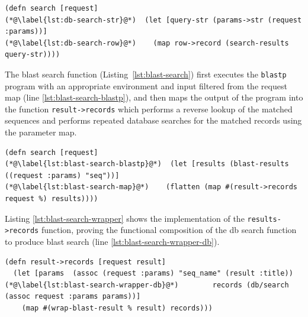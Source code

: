 \lstset{language=Clojure}
\begin{lstlisting}[label=lst:db-search,caption={%
      [The \texttt{db} namespace search function]
      The \texttt{db} namespace search function.}]
(defn search [request]
(*@\label{lst:db-search-str}@*)  (let [query-str (params->str (request :params))]
(*@\label{lst:db-search-row}@*)    (map row->record (search-results query-str))))
\end{lstlisting}


The blast search function (Listing~\ref{lst:blast-search}) first
executes the \texttt{blastp} program with an appropriate environment
and input filtered from the request map (line
\ref{lst:blast-search-blastp}), and then maps the output of the
program into the function \texttt{result->records} which performs a
reverse lookup of the matched sequences and performs repeated database
searches for the matched records using the parameter map.


\lstset{language=Clojure}
\begin{lstlisting}[label=lst:blast-search,caption={%
      [The \texttt{blast} namespace search function]
      The \texttt{blast} namespace search function.}]
(defn search [request]
(*@\label{lst:blast-search-blastp}@*)  (let [results (blast-results ((request :params) "seq"))]
(*@\label{lst:blast-search-map}@*)    (flatten (map #(result->records request %) results))))
\end{lstlisting}

\newpage
Listing \ref{lst:blast-search-wrapper} shows the implementation of the
\texttt{results->records} function, proving the functional composition
of the db search function to produce blast search (line
\ref{lst:blast-search-wrapper-db}).


\lstset{language=Clojure}
\begin{lstlisting}[label=lst:blast-search-wrapper,caption={%
      [The \texttt{blast} namespace search function]
      The \texttt{blast} namespace search function.}]
(defn result->records [request result]
  (let [params  (assoc (request :params) "seq_name" (result :title))
(*@\label{lst:blast-search-wrapper-db}@*)        records (db/search (assoc request :params params))]
    (map #(wrap-blast-result % result) records)))
\end{lstlisting}



